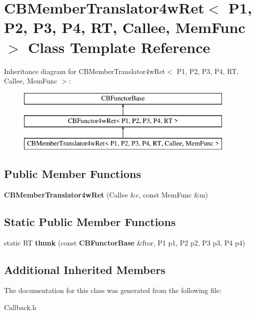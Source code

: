 \section{C\+B\+Member\+Translator4w\+Ret$<$ P1, P2, P3, P4, RT, Callee, Mem\+Func $>$ Class Template Reference}
\label{classCBMemberTranslator4wRet}
Inheritance diagram for C\+B\+Member\+Translator4w\+Ret$<$ P1, P2, P3, P4, RT, Callee, Mem\+Func $>$\+:\begin{figure}[H]
\begin{center}
\leavevmode
\includegraphics[height=3.000000cm]{classCBMemberTranslator4wRet}
\end{center}
\end{figure}
\subsection*{Public Member Functions}
\begin{DoxyCompactItemize}
\item 
{\bfseries C\+B\+Member\+Translator4w\+Ret} (Callee \&c, const Mem\+Func \&m)\label{classCBMemberTranslator4wRet_adccf77b2f6c7b9badb20795db06fcbb7}

\end{DoxyCompactItemize}
\subsection*{Static Public Member Functions}
\begin{DoxyCompactItemize}
\item 
static RT {\bfseries thunk} (const {\bf C\+B\+Functor\+Base} \&ftor, P1 p1, P2 p2, P3 p3, P4 p4)\label{classCBMemberTranslator4wRet_a5f094d9638e1327854be28cb2edcad68}

\end{DoxyCompactItemize}
\subsection*{Additional Inherited Members}


The documentation for this class was generated from the following file\+:\begin{DoxyCompactItemize}
\item 
Callback.\+h\end{DoxyCompactItemize}
